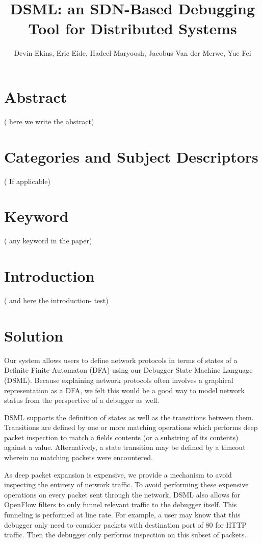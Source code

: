 \documentclass[letterpaper,twocolumn,10pt]{article}
\title{\huge \bf DSML: an SDN-Based Debugging Tool for Distributed Systems  \\}
\author{ \Large Devin Ekins,   Eric Eide,    Hadeel Maryoosh,  Jacobus Van der Merwe,  Yue Fei }
\affil{\large School of Computing,
 University of Utah}
\date{}
\begin{document}
\maketitle

\section*{\LARGE Abstract}

( here we write the abstract) \cite{paper}

\section*{Categories and Subject Descriptors}

( If applicable)

\section*{Keyword}

( any keyword in the paper)

\section{\LARGE Introduction}

( and here the introduction- test)

\section{\LARGE Solution}

Our system allows users to define network protocols in terms of states of a Definite Finite Automaton (DFA) using our Debugger State Machine Language (DSML). Because explaining network protocols often involves a graphical representation as a DFA, we felt this would be a good way to model network status from the perspective of a debugger as well.

DSML supports the definition of states as well as the transitions between them. Transitions are defined by one or more matching operations which performs deep packet inspection to match a fields contents (or a substring of its contents) against a value. Alternatively, a state transition may be defined by a timeout wherein no matching packets were encountered.

As deep packet expansion is expensive, we provide a mechanism to avoid inspecting the entirety of network traffic. To avoid performing these expensive operations on every packet sent through the network, DSML also allows for OpenFlow filters to only funnel relevant traffic to the debugger itself. This funneling is performed at line rate. For example, a user may know that this debugger only need to consider packets with destination port of 80 for HTTP traffic. Then the debugger only performs inspection on this subset of packets.
\end{document}
